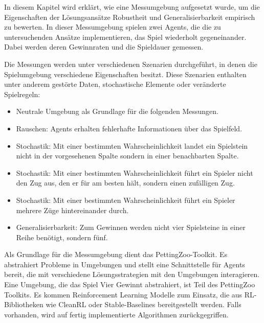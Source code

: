 In diesem Kapitel wird erklärt, wie eine Messumgebung aufgesetzt wurde, um die Eigenschaften der Lösungsansätze Robustheit und Generalisierbarkeit empirisch zu bewerten. In dieser Messumgebung spielen zwei Agents, die die zu untersuchenden Ansätze implementieren, das Spiel wiederholt gegeneinander. Dabei werden deren Gewinnraten und die Spieldauer gemessen.

Die Messungen werden unter verschiedenen Szenarien durchgeführt, in denen die Spiel\-umgebung verschiedene Eigenschaften besitzt. Diese Szenarien enthalten unter anderem gestörte Daten, stochastische Elemente oder veränderte Spielregeln:

\begin{itemize}
	\item Neutrale Umgebung als Grundlage für die folgenden Messungen.
	\item Rauschen: Agents erhalten fehlerhafte Informationen über das Spielfeld.
	\item Stochastik: Mit einer bestimmten Wahrscheinlichkeit landet ein Spielstein nicht in der vorgesehenen Spalte sondern in einer benachbarten Spalte.
	\item Stochastik: Mit einer bestimmten Wahrscheinlichkeit führt ein Spieler nicht den Zug aus, den er für am besten hält, sondern einen zufälligen Zug.
	\item Stochastik: Mit einer bestimmten Wahrscheinlichkeit führt ein Spieler mehrere Züge hintereinander durch.
	\item Generalisierbarkeit: Zum Gewinnen werden nicht vier Spielsteine in einer Reihe benötigt, sondern fünf.
\end{itemize}

Als Grundlage für die Messumgebung dient das PettingZoo-Toolkit. Es abstrahiert Probleme in Umgebungen und stellt eine Schnittstelle für Agents bereit, die mit verschiedene Lösungsstrategien mit den Umgebungen interagieren. Eine Umgebung, die das Spiel Vier Gewinnt abstrahiert, ist Teil des PettingZoo Toolkits. Es kommen Reinforcement Learning Modelle zum Einsatz, die aus RL-Bibliotheken wie CleanRL oder Stable-Baselines bereitgestellt werden. Falls vorhanden, wird auf fertig implementierte Algorithmen zurückgegriffen.
